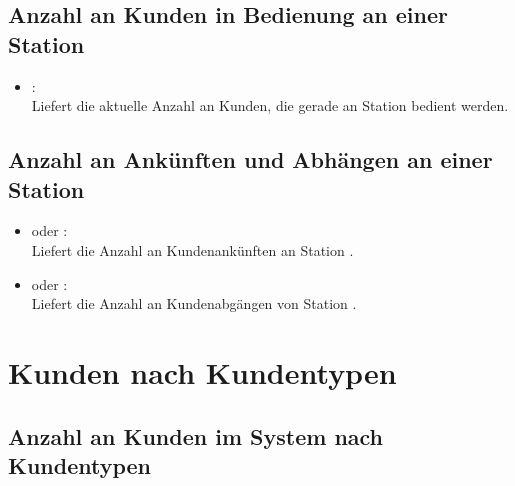 \subsection{Anzahl an Kunden in Bedienung an einer Station}

\begin{itemize}

\item
{}:\\
Liefert die aktuelle Anzahl an Kunden, die gerade an Station  bedient werden.

\end{itemize}  



\subsection{Anzahl an Ankünften und Abhängen an einer Station}

\begin{itemize}

\item
{} oder :\\
Liefert die Anzahl an Kundenankünften an Station .

\item
{} oder :\\
Liefert die Anzahl an Kundenabgängen von Station .

\end{itemize}  





\section{Kunden nach Kundentypen}



\subsection{Anzahl an Kunden im System nach Kundentypen}

